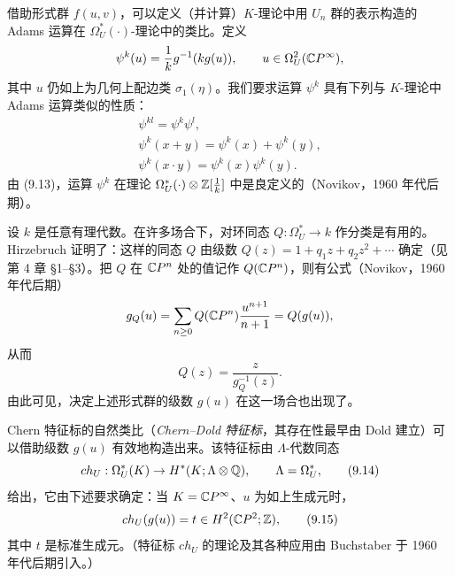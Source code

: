 借助形式群 $f(u,v)$，可以定义（并计算）$K$-理论中用 $U_n$ 群的表示构造的 Adams 运算在 $\Omega_U^*(\cdot)$-理论中的类比。定义
\[
\psi^k(u)=\frac1k g^{-1}(kg(u)),\qquad u\in\Omega_U^2(\mathbb{C}P^\infty),
\]
其中 $u$ 仍如上为几何上配边类 $\sigma_1(\eta)$。我们要求运算 $\psi^k$ 具有下列与 $K$-理论中 Adams 运算类似的性质：
\begin{equation}
\begin{gathered}
\psi^{kl}=\psi^k\psi^l,\\
\psi^k(x+y)=\psi^k(x)+\psi^k(y),\\
\psi^k(x\cdot y)=\psi^k(x)\psi^k(y).
\end{gathered}\tag{9.13}
\end{equation}
由 (9.13)，运算 $\psi^k$ 在理论 $\Omega_U^*(\cdot)\otimes\mathbb{Z}[\tfrac1k]$ 中是良定义的（Novikov，1960 年代后期）。

设 $k$ 是任意有理代数。在许多场合下，对环同态 $Q:\Omega_U^*\to k$ 作分类是有用的。Hirzebruch 证明了：这样的同态 $Q$ 由级数 $Q(z)=1+q_1z+q_2z^2+\cdots$ 确定（见第 4 章 §1--§3）。把 $Q$ 在 $\mathbb{C}P^n$ 处的值记作 $Q(\mathbb{C}P^n)$，则有公式（Novikov，1960 年代后期）
\[
g_Q(u)=\sum_{n\ge0}Q(\mathbb{C}P^n)\frac{u^{n+1}}{n+1}=Q(g(u)),
\]
从而
\[
Q(z)=\frac{z}{g_Q^{-1}(z)}.
\]
由此可见，决定上述形式群的级数 $g(u)$ 在这一场合也出现了。

Chern 特征标的自然类比（\emph{Chern--Dold 特征标}，其存在性最早由 Dold 建立）可以借助级数 $g(u)$ 有效地构造出来。该特征标由 $\Lambda$-代数同态
\begin{equation}
ch_U:\Omega_U^*(K)\to H^*(K;\Lambda\otimes\mathbb{Q}),\qquad \Lambda=\Omega_U^*, \tag{9.14}
\end{equation}
给出，它由下述要求确定：当 $K=\mathbb{C}P^\infty$、$u$ 为如上生成元时，
\begin{equation}
ch_U(g(u))=t\in H^2(\mathbb{C}P^2;\mathbb{Z}), \tag{9.15}
\end{equation}
其中 $t$ 是标准生成元。（特征标 $ch_U$ 的理论及其各种应用由 Buchstaber 于 1960 年代后期引入。）

